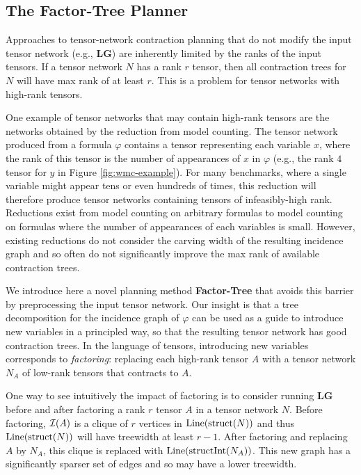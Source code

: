 \subsection{The Factor-Tree Planner}
\label{sec:tensors:preprocessing}
Approaches to tensor-network contraction planning that do not modify the input tensor network (e.g., \textbf{LG}) are inherently limited by the ranks of the input tensors.
If a tensor network $N$ has a rank $r$ tensor, then all contraction trees for $N$ will have max rank of at least $r$.
This is a problem for tensor networks with high-rank tensors. 

One example of tensor networks that may contain high-rank tensors are the networks obtained by the reduction from model counting. The tensor network produced from a formula $\varphi$ contains a tensor representing each variable $x$, where the rank of this tensor is the number of appearances of $x$ in $\varphi$ (e.g., the rank $4$ tensor for $y$ in Figure \ref{fig:wmc-example}). For many benchmarks, where a single variable might appear tens or even hundreds of times, this reduction will therefore produce tensor networks containing tensors of infeasibly-high rank. Reductions exist from model counting on arbitrary formulas to model counting on formulas where the number of appearances of each variables is small. However, existing reductions do not consider the carving width of the resulting incidence graph and so often do not significantly improve the max rank of available contraction trees. 

We introduce here a novel planning method \textbf{Factor-Tree} that avoids this barrier by preprocessing the input tensor network. Our insight is that a tree decomposition for the incidence graph of $\varphi$ can be used as a guide to introduce new variables in a principled way, so that the resulting tensor network has good contraction trees. 
In the language of tensors, introducing new variables corresponds to \emph{factoring}: replacing each high-rank tensor $A$ with a tensor network $N_A$ of low-rank tensors that contracts to $A$.

{ \color{blue}
One way to see intuitively the impact of factoring is to consider running \textbf{LG} before and after factoring a rank $r$ tensor $A$ in a tensor network $N$.
Before factoring, $\mathcal{I}(A)$ is a clique of $r$ vertices in $\text{Line}(\text{struct}(N))$ and thus $\text{Line}(\text{struct}(N))$ will have treewidth at least $r-1$.
After factoring and replacing $A$ by $N_A$, this clique is replaced with $\text{Line}(\text{structInt}(N_A))$.
This new graph has a significantly sparser set of edges and so may have a lower treewidth.
} %

